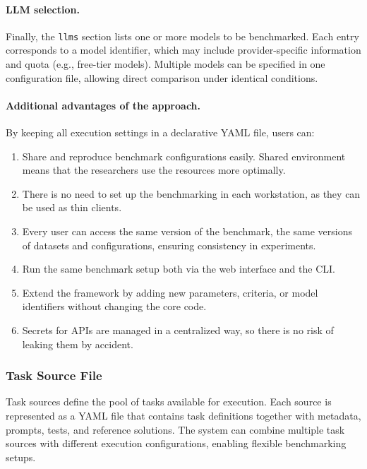 \paragraph{LLM selection.}
Finally, the \texttt{llms} section lists one or more models to be benchmarked.
Each entry corresponds to a model identifier, which may include provider-specific information and quota (e.g., free-tier models).
Multiple models can be specified in one configuration file, allowing direct comparison under identical conditions.


\paragraph{Additional advantages of the approach.}
By keeping all execution settings in a declarative YAML file, users can:
\begin{enumerate}
    \item Share and reproduce benchmark configurations easily. Shared environment means that the researchers use the resources more optimally.
    \item There is no need to set up the benchmarking in each workstation, as they can be used as thin clients.
    \item Every user can access the same version of the benchmark, the same versions of datasets and configurations, ensuring consistency in experiments.
    \item Run the same benchmark setup both via the web interface and the CLI.
    \item Extend the framework by adding new parameters, criteria, or model identifiers without changing the core code.
    \item Secrets for APIs are managed in a centralized way, so there is no risk of leaking them by accident.
\end{enumerate}


\subsubsection{Task Source File}

Task sources define the pool of tasks available for execution.
Each source is represented as a YAML file that contains task definitions together with metadata, prompts, tests, and reference solutions.
The system can combine multiple task sources with different execution configurations, enabling flexible benchmarking setups.

